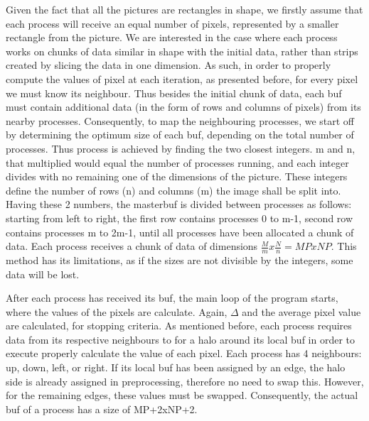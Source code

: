 \documentclass[11pt]{article}
\begin{document}
	Given the fact that all the pictures are rectangles in shape, we firstly assume that each process will receive an equal number of pixels, represented by a smaller rectangle from the picture. We are interested in the case where each process works on chunks of data similar in shape with the initial data, rather than strips created by slicing the data in one dimension. As such, in order to properly compute the values of pixel at each iteration, as presented before, for every pixel we must know its neighbour. Thus besides the initial chunk of data, each buf must contain additional data (in the form of rows and columns of pixels) from its nearby processes. Consequently, to map the neighbouring processes, we start off by determining the optimum size of each buf, depending on the total number of processes. Thus process is achieved by finding the two closest integers. m and n, that multiplied would equal the number of processes running, and each integer divides with no remaining one of the dimensions of the picture. These integers define the number of rows (n) and columns (m) the image shall be split into. Having these 2 numbers, the masterbuf is divided between processes as follows: starting from left to right, the first row contains processes 0 to m-1, second row contains processes m to 2m-1, until all processes have been allocated a chunk of data. Each process receives a chunk of data of dimensions $\frac{M}{m}x\frac{N}{n} =MP x NP$. This method has its limitations, as if the sizes are not divisible by the integers, some data will be lost.
	
	After each process has received its buf, the main loop of the program starts, where the values of the pixels are calculate. Again, $\Delta$ and the average pixel value are calculated, for stopping criteria. As mentioned before, each process requires data from its respective neighbours to for a halo around its local buf in order to execute properly calculate the value of each pixel. Each process has 4 neighbours: up, down, left, or right. If its local buf has been assigned by an edge, the halo side is already assigned in preprocessing, therefore no need to swap this. However, for the remaining edges, these values must be swapped. Consequently, the actual buf of a process has a size of MP+2xNP+2.
	
\end{document}

